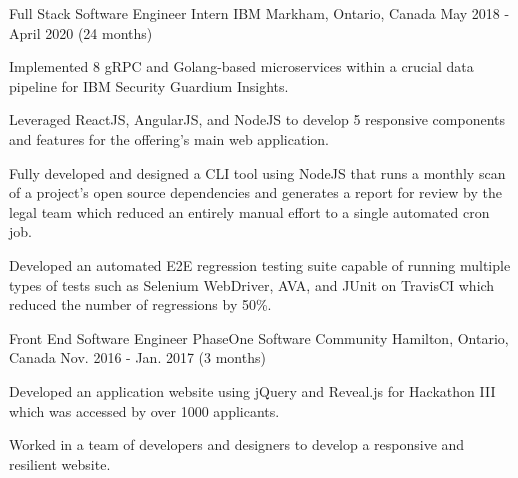 


\begin{cventries}


\cventry
{Full Stack Software Engineer Intern} %
{IBM} %
{Markham, Ontario, Canada} %
{May 2018 - April 2020 (24 months)} %
{ %
\begin{cvitems}
\item {Implemented 8 gRPC and Golang-based microservices within a crucial data pipeline for IBM Security Guardium Insights.}
\item {Leveraged ReactJS, AngularJS, and NodeJS to develop 5 responsive components and features for the offering's main web application.}
\item {Fully developed and designed a CLI tool using NodeJS that runs a monthly scan of a project's open source dependencies and generates a report for review by the legal team which reduced an entirely manual effort to a single automated cron job.}
\item {Developed an automated E2E regression testing suite capable of running multiple types of tests such as Selenium WebDriver, AVA, and JUnit on TravisCI which reduced the number of regressions by 50\%.}
\end{cvitems}
}


\cventry
{Front End Software Engineer} %
{PhaseOne Software Community} %
{Hamilton, Ontario, Canada} %
{Nov. 2016 - Jan. 2017 (3 months)} %
{ %
\begin{cvitems}
\item {Developed an application website using jQuery and Reveal.js for Hackathon III which was accessed by over 1000 applicants.}
\item {Worked in a team of developers and designers to develop a responsive and resilient website.}
\end{cvitems}
}


\end{cventries}